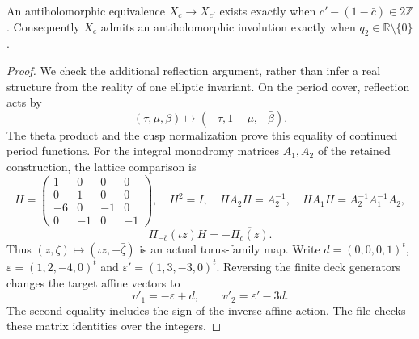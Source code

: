 \begin{proposition}\label{ari:C.2.2}
An antiholomorphic equivalence $X_c\to X_{c'}$ exists exactly when
$c'-(1-\bar c)\in2\mathbb Z$. Consequently $X_c$ admits an
antiholomorphic involution exactly when $q_2\in\mathbb R\setminus\{0\}$.
\end{proposition}

\begin{proof}
We check the additional reflection argument, rather than infer a real
structure from the reality of one elliptic invariant. On the period
cover, reflection acts by
\[
 (\tau,\mu,\beta)\longmapsto(-\bar\tau,1-\bar\mu,-\bar\beta).
\]
The theta product and the cusp normalization prove this equality of
continued period functions. For the integral monodromy matrices
$A_1,A_2$ of the retained construction, the lattice comparison is
\[
 H=\begin{pmatrix}1&0&0&0\\0&1&0&0\\-6&0&-1&0\\0&-1&0&-1\end{pmatrix},
 \quad H^2=I,\quad HA_2H=A_2^{-1},\quad
 HA_1H=A_2^{-1}A_1^{-1}A_2,
\]
\[
 \Pi_{-\bar c}(\iota z)H=-\overline{\Pi_c(z)}.
\]
Thus $(z,\zeta)\mapsto(\iota z,-\bar\zeta)$ is an actual torus-family
map. Write $d=(0,0,0,1)^t$, $\varepsilon=(1,2,-4,0)^t$ and
$\varepsilon'=(1,3,-3,0)^t$. Reversing the finite deck generators
changes the target affine vectors to
\[
 v'_1=-\varepsilon+d,\qquad v'_2=\varepsilon'-3d.
\]
The second equality includes the sign of the inverse affine action.
The file  checks these matrix identities
over the integers.


\end{proof}
